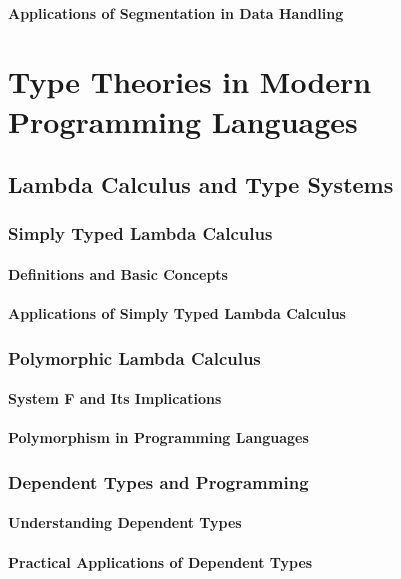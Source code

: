\documentclass[12pt, oneside]{book}
\begin{document}
\subsubsection{Applications of Segmentation in Data Handling}

\chapter{Type Theories in Modern Programming Languages}
\section{Lambda Calculus and Type Systems}
\subsection{Simply Typed Lambda Calculus}
\subsubsection{Definitions and Basic Concepts}
\subsubsection{Applications of Simply Typed Lambda Calculus}
\subsection{Polymorphic Lambda Calculus}
\subsubsection{System F and Its Implications}
\subsubsection{Polymorphism in Programming Languages}
\subsection{Dependent Types and Programming}
\subsubsection{Understanding Dependent Types}
\subsubsection{Practical Applications of Dependent Types}
\end{document}
